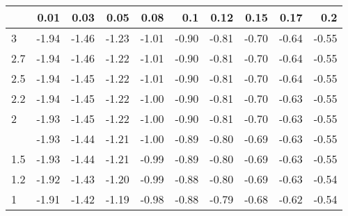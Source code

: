 
\begin{tabular}{lrrrrrrrrr}
\toprule
  & 0.01 & 0.03 & 0.05 & 0.08 & 0.1 & 0.12 & 0.15 & 0.17 & 0.2\\
\midrule
3 & -1.94 & -1.46 & -1.23 & -1.01 & -0.90 & -0.81 & -0.70 & -0.64 & -0.55\\
2.7 & -1.94 & -1.46 & -1.22 & -1.01 & -0.90 & -0.81 & -0.70 & -0.64 & -0.55\\
2.5 & -1.94 & -1.45 & -1.22 & -1.01 & -0.90 & -0.81 & -0.70 & -0.64 & -0.55\\
2.2 & -1.94 & -1.45 & -1.22 & -1.00 & -0.90 & -0.81 & -0.70 & -0.63 & -0.55\\
2 & -1.93 & -1.45 & -1.22 & -1.00 & -0.90 & -0.81 & -0.70 & -0.63 & -0.55\\
\addlinespace
1.7 & -1.93 & -1.44 & -1.21 & -1.00 & -0.89 & -0.80 & -0.69 & -0.63 & -0.55\\
1.5 & -1.93 & -1.44 & -1.21 & -0.99 & -0.89 & -0.80 & -0.69 & -0.63 & -0.55\\
1.2 & -1.92 & -1.43 & -1.20 & -0.99 & -0.88 & -0.80 & -0.69 & -0.63 & -0.54\\
1 & -1.91 & -1.42 & -1.19 & -0.98 & -0.88 & -0.79 & -0.68 & -0.62 & -0.54\\
\bottomrule
\end{tabular}
